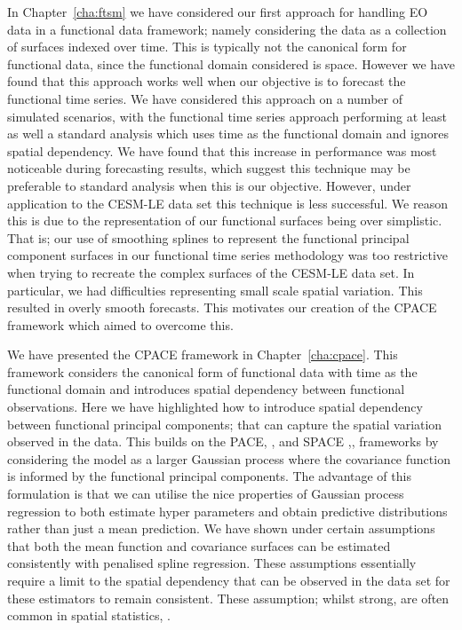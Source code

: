 In Chapter~\ref{cha:ftsm} we have considered our first approach for handling EO data in a functional data framework; namely considering the data as a collection of surfaces indexed over time.
This is typically not the canonical form for functional data, since the functional domain considered is space.
However we have found that this approach works well when our objective is to forecast the functional time series.
We have considered this approach on a number of simulated scenarios, with the functional time series approach performing at least as well a standard analysis which uses time as the functional domain and ignores spatial dependency.
We have found that this increase in performance was most noticeable during forecasting results, which suggest this technique may be preferable to standard analysis when this is our objective.
However, under application to the CESM-LE data set this technique is less successful.
We reason this is due to the representation of our functional surfaces being over simplistic.
That is; our use of smoothing splines to represent the functional principal component surfaces in our functional time series methodology was too restrictive when trying to recreate the complex surfaces of the CESM-LE data set.
In particular, we had difficulties representing small scale spatial variation.
This resulted in overly smooth forecasts.
This motivates our creation of the CPACE framework which aimed to overcome this.

We have presented the CPACE framework in Chapter~\ref{cha:cpace}. 
This framework considers the canonical form of functional data with time as the functional domain and introduces spatial dependency between functional observations.
Here we have highlighted how to introduce spatial dependency between functional principal components; that can capture the spatial variation observed in the data.
This builds on the PACE, \citep{yao_functional_2005}, and SPACE ,\citep{liu_functional_2017}, frameworks by considering the model as a larger Gaussian process where the covariance function is informed by the functional principal components.
The advantage of this formulation is that we can utilise the nice properties of Gaussian process regression to both estimate hyper parameters and obtain predictive distributions rather than just a mean prediction. 
We have shown under certain assumptions that both the mean function and covariance surfaces can be estimated consistently with penalised spline regression.
These assumptions essentially require a limit to the spatial dependency that can be observed in the data set for these estimators to remain consistent.
These assumption; whilst strong, are often common in spatial statistics, \citep{cressie_statistics_2010}.

